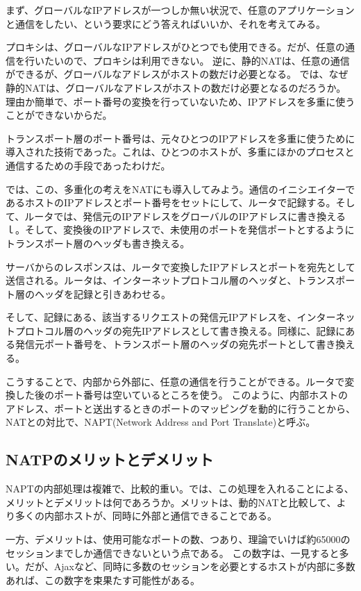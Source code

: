まず、グローバルなIPアドレスが一つしか無い状況で、任意のアプリケーションと通信をしたい、という要求にどう答えればいいか、それを考えてみる。

プロキシは、グローバルなIPアドレスがひとつでも使用できる。だが、任意の通信を行いたいので、プロキシは利用できない。
逆に、静的NATは、任意の通信ができるが、グローバルなアドレスがホストの数だけ必要となる。
では、なぜ静的NATは、グローバルなアドレスがホストの数だけ必要となるのだろうか。理由か簡単で、ポート番号の変換を行っていないため、IPアドレスを多重に使うことができないからだ。

トランスポート層のポート番号は、元々ひとつのIPアドレスを多重に使うために導入された技術であった。これは、ひとつのホストが、多重にほかのプロセスと通信するための手段であったわけだ。

では、この、多重化の考えをNATにも導入してみよう。通信のイニシエイターであるホストのIPアドレスとポート番号をセットにして、ルータで記録する。そして、ルータでは、発信元のIPアドレスをグローバルのIPアドレスに書き換えるｌ。そして、変換後のIPアドレスで、未使用のポートを発信ポートとするようにトランスポート層のヘッダも書き換える。

サーバからのレスポンスは、ルータで変換したIPアドレスとポートを宛先として送信される。ルータは、インターネットプロトコル層のヘッダと、トランスポート層のヘッダを記録と引きあわせる。

そして、記録にある、該当するリクエストの発信元IPアドレスを、インターネットプロトコル層のヘッダの宛先IPアドレスとして書き換える。同様に、記録にある発信元ポート番号を、トランスポート層のヘッダの宛先ポートとして書き換える。

こうすることで、内部から外部に、任意の通信を行うことができる。ルータで変換した後のポート番号は空いているところを使う。
このように、内部ホストのアドレス、ポートと送出するときのポートのマッピングを動的に行うことから、NATとの対比で、NAPT(Network Address and Port Translate)と呼ぶ。

\subsection{NATPのメリットとデメリット}
NAPTの内部処理は複雑で、比較的重い。では、この処理を入れることによる、メリットとデメリットは何であろうか。メリットは、動的NATと比較して、より多くの内部ホストが、同時に外部と通信できることである。

一方、デメリットは、使用可能なポートの数、つあり、理論でいけば約65000のセッションまでしか通信できないという点である。
この数字は、一見すると多い。だが、Ajaxなど、同時に多数のセッションを必要とするホストが内部に多数あれば、この数字を束果たす可能性がある。

